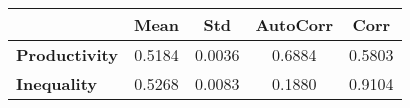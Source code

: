 \begin{tiny}\begin{tabular}{|l|c|c|c|c|}
\hline
&\textbf{Mean}&\textbf{Std}&\textbf{AutoCorr}&\textbf{Corr}\\\hline
\textbf{Productivity}&0.5184&0.0036&0.6884&0.5803\\\hline
\textbf{Inequality}&0.5268&0.0083&0.1880&0.9104\\\hline
\end{tabular}
\end{tiny}